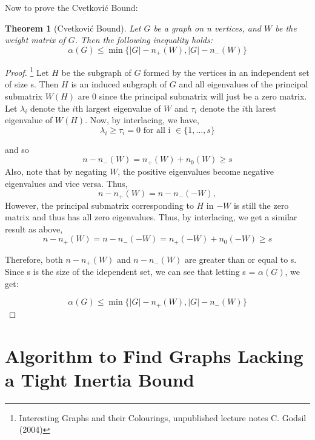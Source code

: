 \documentclass[12pt]{article}
\theoremstyle{parenbold}
\newtheorem{theorem}{Theorem}[section]
\begin{document}
Now to prove the Cvetkovi\'c Bound:

\begin{theorem}[Cvetkovi\'c Bound]
Let $G$ be a graph on n vertices, and $W$ be the weight matrix of $G$. Then the following inequality holds:
\begin{equation}
\alpha(G) \leq \min\{|G| - n_+(W),|G|-n_-(W)\}
\end{equation}
\end{theorem}

\begin{proof}\footnote{Interesting Graphs and their Colourings, unpublished lecture notes C. Godsil (2004)}
Let $H$ be the subgraph of $G$ formed by the vertices in an independent set of size s. Then $H$ is an induced subgraph of $G$ and all eigenvalues of the principal submatrix $W(H)$ are 0 since the principal submatrix will just be a zero matrix. Let $\lambda_i$ denote the $i$th largest eigenvalue of $W$ and $\tau_i$ denote the $i$th larest eigenvalue of $W(H)$. Now, by interlacing, we have,
\begin{equation}
\lambda_i \geq \tau_i = 0 \text{ for all i } \in \{1,\ldots ,s\}
\end{equation}

and so 
\begin{equation}
n - n_-(W) = n_+(W) + n_0(W) \geq s
\end{equation}
Also, note that by negating $W$, the positive eigenvalues become negative eigenvalues and vice versa. Thus,
\begin{equation}
n - n_+(W) = n - n_-(-W),
\end{equation}
However, the principal submatrix corresponding to $H$ in $-W$ is still the zero matrix and thus has all zero eigenvalues. Thus, by interlacing, we get a similar result as above, 
\begin{equation}
n - n_+(W) = n - n_-(-W) = n_+(-W) + n_0(-W) \geq s
\end{equation}

Therefore, both $n - n_+(W)$ and $n - n_-(W)$ are greater than or equal to s. Since s is the size of the idependent set, we can see that letting s = $\alpha(G)$, we get:

\begin{equation}
\alpha(G) \leq \min\{|G| - n_+(W),|G|-n_-(W)\}
\end{equation}

\end{proof}

\section{Algorithm to Find Graphs Lacking a Tight Inertia Bound}
\end{document}
